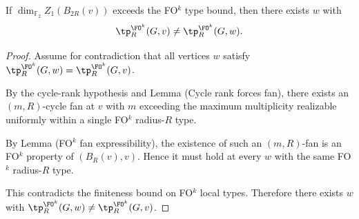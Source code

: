 \begin{theorem}
If $\dim_{\mathbb F_2} Z_1(B_{2R}(v))$ exceeds the FO$^k$ type bound, then there exists $w$ with
\[
\tp^{\FO^k}_R(G,v) \neq \tp^{\FO^k}_R(G,w).
\]
\end{theorem}

\begin{proof}
Assume for contradiction that all vertices $w$ satisfy
$\tp^{\FO^k}_R(G,w)=\tp^{\FO^k}_R(G,v)$.

By the cycle-rank hypothesis and Lemma (Cycle rank forces fan),
there exists an $(m,R)$-cycle fan at $v$ with $m$ exceeding the
maximum multiplicity realizable uniformly within a single FO$^k$
radius-$R$ type.

By Lemma (FO$^k$ fan expressibility), the existence of such an
$(m,R)$-fan is an FO$^k$ property of $(B_R(v),v)$.
Hence it must hold at every $w$ with the same FO$^k$ radius-$R$ type.

This contradicts the finiteness bound on FO$^k$ local types.
Therefore there exists $w$ with
$\tp^{\FO^k}_R(G,w)\neq\tp^{\FO^k}_R(G,v)$.
\end{proof}

